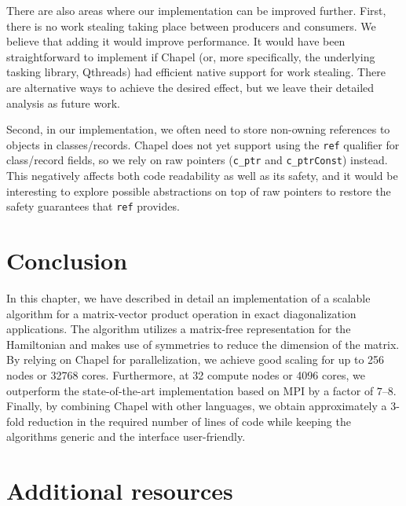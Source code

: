 There are also areas where our implementation can be improved further. First, there is no work stealing taking place between producers and consumers. We believe that adding it would improve performance. It would have been straightforward to implement if Chapel (or, more specifically, the underlying tasking library, Qthreads) had efficient native support for work stealing. There are alternative ways to achieve the desired effect, but we leave their detailed analysis as future work.

Second, in our implementation, we often need to store non-owning references to objects in classes/records. Chapel does not yet support using the \verb|ref| qualifier for class/record fields, so we rely on raw pointers (\verb|c_ptr| and \verb|c_ptrConst|) instead. This negatively affects both code readability as well as its safety, and it would be interesting to explore possible abstractions on top of raw pointers to restore the safety guarantees that \verb|ref| provides.

\section{Conclusion}\label{sec:ls23:conclusion}

In this chapter, we have described in detail an implementation of a scalable algorithm for a matrix-vector product operation in exact diagonalization applications. The algorithm utilizes a matrix-free representation for the Hamiltonian and makes use of symmetries to reduce the dimension of the matrix. By relying on Chapel for parallelization, we achieve good scaling for up to 256 nodes or 32768 cores. Furthermore, at 32 compute nodes or 4096 cores, we outperform the state-of-the-art implementation based on MPI by a factor of $7$--$8$. Finally, by combining Chapel with other languages, we obtain approximately a 3-fold reduction in the required number of lines of code while keeping the algorithms generic and the interface user-friendly.

\section{Additional resources}

